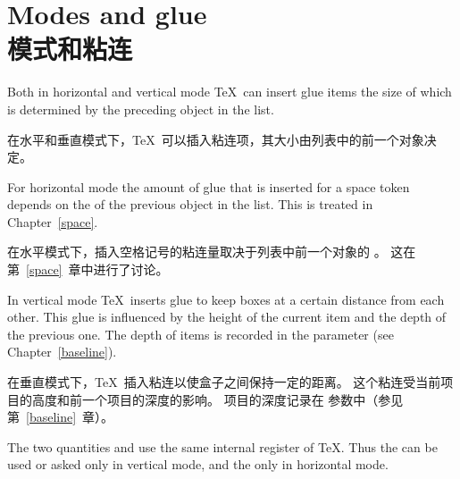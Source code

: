 \documentclass[twoside,letterpaper]{rapport3}
\begin{document}


\setcounter{chapter}{5} 



\section{Modes and glue\\模式和粘连}

Both in horizontal and vertical mode
\TeX\ can insert glue items the size of which is
determined by the preceding object in the list.

在水平和垂直模式下，\TeX\ 可以插入粘连项，其大小由列表中的前一个对象决定。

For horizontal mode the amount of glue that is inserted
for a space token depends on the  of
the previous object in the list. This is treated
in Chapter~\ref{space}.

在水平模式下，插入空格记号的粘连量取决于列表中前一个对象的 。
这在第~\ref{space}~章中进行了讨论。

In vertical mode \TeX\ inserts glue to keep boxes at a certain
distance from each other. This glue is influenced by the
height of the current item and the depth of the previous one.
The depth of items is recorded in the  parameter
(see Chapter~\ref{baseline}).

在垂直模式下，\TeX\ 插入粘连以使盒子之间保持一定的距离。
这个粘连受当前项目的高度和前一个项目的深度的影响。
项目的深度记录在  参数中（参见第~\ref{baseline}~章）。

The two quantities  
and  
use the same internal register of \TeX. Thus the 
can be used or asked only in vertical mode, and the 
only in horizontal mode.
\end{document}
